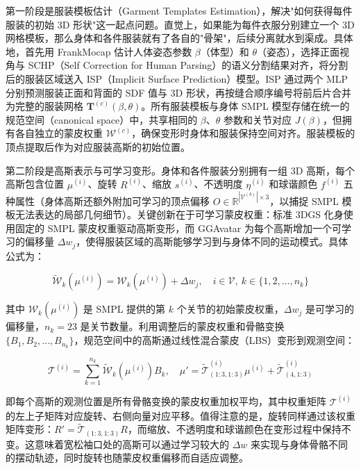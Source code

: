 第一阶段是服装模板估计（Garment Templates Estimation），解决"如何获得每件服装的初始 3D 形状"这一起点问题。直觉上，如果能为每件衣服分别建立一个 3D 网格模板，那么身体和各件服装就有了各自的"骨架"，后续分离就水到渠成。具体地，首先用 FrankMocap 估计人体姿态参数 $\beta$（体型）和 $\theta$（姿态），选择正面视角与 SCHP（Self Correction for Human Parsing）的语义分割结果对齐，将分割后的服装区域送入 ISP（Implicit Surface Prediction）模型。ISP 通过两个 MLP 分别预测服装正面和背面的 SDF 值与 3D 形状，再按缝合顺序编号将前后片合并为完整的服装网格 $\mathbf{T}^{(c)}(\beta, \theta)$。所有服装模板与身体 SMPL 模型存储在统一的规范空间（canonical space）中，共享相同的 $\beta$、$\theta$ 参数和关节对应 $J(\beta)$，但拥有各自独立的蒙皮权重 $\mathcal{W}^{(c)}$，确保变形时身体和服装保持空间对齐。服装模板的顶点提取后作为对应服装高斯的初始位置。

第二阶段是高斯表示与可学习变形。身体和各件服装分别拥有一组 3D 高斯，每个高斯包含位置 $\mu^{(i)}$、旋转 $R^{(i)}$、缩放 $s^{(i)}$、不透明度 $\eta^{(i)}$ 和球谐颜色 $f^{(i)}$ 五种属性（身体高斯还额外附加可学习的顶点偏移 $O \in \mathbb{R}^{|\mathcal{V}^{(b)}| \times 3}$，以捕捉 SMPL 模板无法表达的局部几何细节）。关键创新在于可学习蒙皮权重：标准 3DGS 化身使用固定的 SMPL 蒙皮权重驱动高斯变形，而 GGAvatar 为每个高斯增加一个可学习的偏移量 $\Delta w_j$，使得服装区域的高斯能够学习到与身体不同的运动模式。具体公式为：

\begin{equation}
\tilde{\mathcal{W}}_k(\mu^{(i)}) = \mathcal{W}_k(\mu^{(i)}) + \Delta w_j, \quad i \in \mathcal{V}, \ k \in \{1, 2, \ldots, n_k\}
\end{equation}

其中 $\mathcal{W}_k(\mu^{(i)})$ 是 SMPL 提供的第 $k$ 个关节的初始蒙皮权重，$\Delta w_j$ 是可学习的偏移量，$n_k = 23$ 是关节数量。利用调整后的蒙皮权重和骨骼变换 $\{B_1, B_2, \ldots, B_{n_k}\}$，规范空间中的高斯通过线性混合蒙皮（LBS）变形到观测空间：

\begin{equation}
\mathcal{T}^{(i)} = \sum_{k=1}^{n_k} \tilde{\mathcal{W}}_k(\mu^{(i)}) B_k, \quad \mu' = \tilde{\mathcal{T}}^{(i)}_{(1:3,1:3)} \mu^{(i)} + \tilde{\mathcal{T}}^{(i)}_{(4,1:3)}
\end{equation}

即每个高斯的观测位置是所有骨骼变换的蒙皮权重加权平均，其中权重矩阵 $\mathcal{T}^{(i)}$ 的左上子矩阵对应旋转、右侧向量对应平移。值得注意的是，旋转同样通过该权重矩阵变形：$R' = \tilde{\mathcal{T}}_{(1:3,1:3)} R$，而缩放、不透明度和球谐颜色在变形过程中保持不变。这意味着宽松袖口处的高斯可以通过学习较大的 $\Delta w$ 来实现与身体骨骼不同的摆动轨迹，同时旋转也随蒙皮权重偏移而自适应调整。

